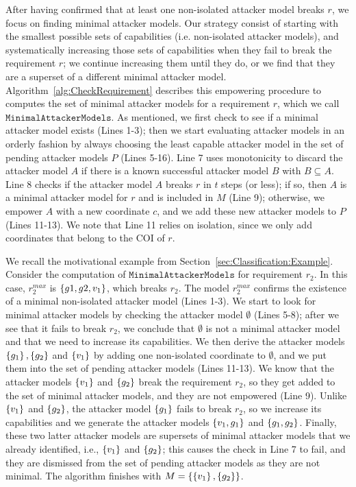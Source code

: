 After having confirmed that at least one non-isolated attacker model breaks $r$, we focus on finding minimal attacker models. Our strategy consist of starting with the smallest possible sets of capabilities (i.e. non-isolated attacker models), and systematically increasing those sets of capabilities when they fail to break the requirement $r$; we continue increasing them until they do, or we find that they are a superset of a different minimal attacker model. Algorithm~\ref{alg:CheckRequirement} describes this empowering procedure to computes the set of minimal attacker models for a requirement $r$, which we call $\mathtt{MinimalAttackerModels}$. As mentioned, we first check to see if a minimal attacker model exists (Lines 1-3); then we start evaluating attacker models in an orderly fashion by always choosing the least capable attacker model in the set of pending attacker models $P$ (Lines 5-16). Line 7 uses monotonicity to discard the attacker model $A$ if there is a known successful attacker model $B$ with $B\subseteq A$. Line 8 checks if the attacker model $A$ breaks $r$ in $t$ steps (or less); if so, then $A$ is a minimal attacker model for $r$ and is included in $M$ (Line 9); otherwise, we empower $A$ with a new coordinate $c$, and we add these new attacker models to $P$ (Lines 11-13). We note that Line 11 relies on isolation, since we only add coordinates that belong to the COI of $r$.

\begin{example}
We recall the motivational example from Section~\ref{sec:Classification:Example}. 
Consider the computation of $\mathtt{MinimalAttackerModels}$ for requirement $r_2$. In this case, $r_2^{max}$ is $\left\{g1,g2,v_1\right\}$, which breaks $r_2$. The model $r_2^{max}$ confirms the existence of a minimal non-isolated attacker model (Lines 1-3). We start to look for minimal attacker models by checking the attacker model $\emptyset$ (Lines 5-8); after we see that it fails to break $r_2$, we conclude that $\emptyset$ is not a minimal attacker model and that we need to increase its capabilities. We then derive the attacker models $\left\{g_1\right\}, \left\{g_2\right\}$ and $\left\{v_1\right\}$ by adding one non-isolated coordinate to $\emptyset$, and we put them into the set of pending attacker models (Lines 11-13). We know that the attacker models $\left\{v_1\right\}$ and $\left\{g_2\right\}$ break the requirement $r_2$, so they get added to the set of minimal attacker models, and they are not empowered (Line 9). Unlike $\left\{v_1\right\}$ and $\left\{g_2\right\}$, the attacker model $\left\{g_1\right\}$ fails to break $r_2$, so we increase its capabilities and we generate the attacker models $\left\{v_1, g_1\right\}$ and $\left\{g_1, g_2\right\}$. Finally, these two latter attacker models are supersets of minimal attacker models that we already identified, i.e., $\left\{v_1\right\}$ and $\left\{g_2\right\}$; this causes the check in Line 7 to fail, and they are dismissed from the set of pending attacker models as they are not minimal. The algorithm finishes with $M=\left\{\left\{v_1\right\}, \left\{g_2\right\}\right\}$.
\end{example}

